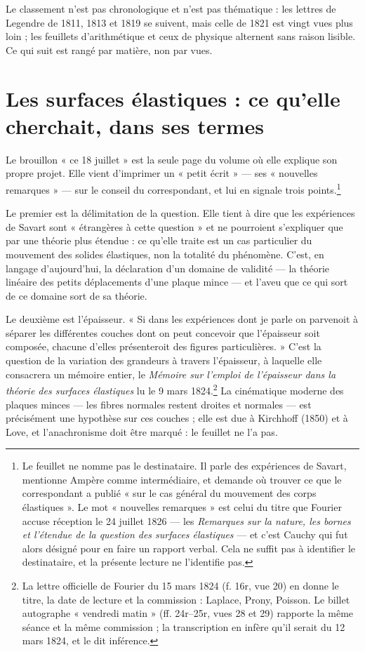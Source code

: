 \documentclass[11pt,a4paper]{article}
\begin{document}
Le classement n'est pas chronologique et n'est pas thématique : les lettres de
Legendre de 1811, 1813 et 1819 se suivent, mais celle de 1821 est vingt vues
plus loin ; les feuillets d'arithmétique et ceux de physique alternent sans
raison lisible. Ce qui suit est rangé par matière, non par vues.

\section*{Les surfaces élastiques : ce qu'elle cherchait, dans ses termes}

Le brouillon « ce 18 juillet » est la seule page du volume où elle explique
son propre projet. Elle vient d'imprimer un « petit écrit » — ses « nouvelles
remarques » — sur le conseil du correspondant, et lui en signale trois
points.\footnote{Le feuillet ne nomme pas le destinataire. Il parle des
expériences de Savart, mentionne Ampère comme intermédiaire, et demande où
trouver ce que le correspondant a publié « sur le cas général du mouvement des
corps élastiques ». Le mot « nouvelles remarques » est celui du titre que
Fourier accuse réception le 24 juillet 1826 — les \emph{Remarques sur la
nature, les bornes et l'étendue de la question des surfaces élastiques} — et
c'est Cauchy qui fut alors désigné pour en faire un rapport verbal. Cela ne
suffit pas à identifier le destinataire, et la présente lecture ne
l'identifie pas.}

Le premier est la délimitation de la question. Elle tient à dire que les
expériences de Savart sont « étrangères à cette question » et ne pourroient
s'expliquer que par une théorie plus étendue : ce qu'elle traite est un cas
particulier du mouvement des solides élastiques, non la totalité du
phénomène. C'est, en langage d'aujourd'hui, la déclaration d'un domaine de
validité — la théorie linéaire des petits déplacements d'une plaque mince —
et l'aveu que ce qui sort de ce domaine sort de sa théorie.

Le deuxième est l'épaisseur. « Si dans les expériences dont je parle on
parvenoit à séparer les différentes couches dont on peut concevoir que
l'épaisseur soit composée, chacune d'elles présenteroit des figures
particulières. » C'est la question de la variation des grandeurs à travers
l'épaisseur, à laquelle elle consacrera un mémoire entier, le \emph{Mémoire
sur l'emploi de l'épaisseur dans la théorie des surfaces élastiques} lu le 9
mars 1824.\footnote{La lettre officielle de Fourier du 15 mars 1824 (f. 16r,
vue 20) en donne le titre, la date de lecture et la commission : Laplace,
Prony, Poisson. Le billet autographe « vendredi matin » (ff. 24r–25r, vues 28
et 29) rapporte la même séance et la même commission ; la transcription en
infère qu'il serait du 12 mars 1824, et le dit inférence.} La cinématique
moderne des plaques minces — les fibres normales restent droites et normales
— est précisément une hypothèse sur ces couches ; elle est due à Kirchhoff
(1850) et à Love, et l'anachronisme doit être marqué : le feuillet ne l'a pas.
\end{document}
